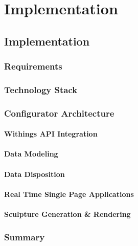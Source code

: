 \chapter{Implementation}
\label{ch:conf}
\section{Implementation}
\subsection{Requirements}
\subsection{Technology Stack}
\subsection{Configurator Architecture}
\subsubsection{Withings API Integration}
\subsubsection{Data Modeling}
\subsubsection{Data Disposition}
\subsubsection{Real Time Single Page Applications}
\subsubsection{Sculpture Generation \& Rendering}
\subsection{Summary}
